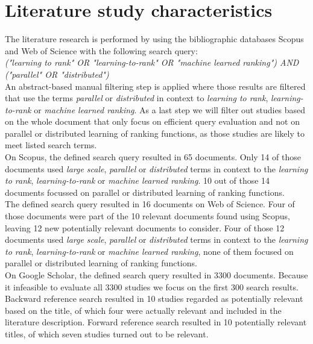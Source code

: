 \section{Literature study characteristics}
The literature research is performed by using the bibliographic databases Scopus and Web of Science with the following search query:\\

\emph{("learning to rank" \emph{OR} "learning-to-rank" \emph{OR} "machine learned ranking") \emph{AND} ("parallel" \emph{OR} "distributed")}\\
 
An abstract-based manual filtering step is applied where those results are filtered that use the terms \emph{parallel} or \emph{distributed} in context to \emph{learning to rank}, \emph{learning-to-rank} or \emph{machine learned ranking}. As a last step we will filter out studies based on the whole document that only focus on efficient query evaluation and not on parallel or distributed learning of ranking functions, as those studies are likely to meet listed search terms.\\

On Scopus, the defined search query resulted in 65 documents. Only 14 of those documents used \emph{large scale}, \emph{parallel} or \emph{distributed} terms in context to the \emph{learning to rank}, \emph{learning-to-rank} or \emph{machine learned ranking}. 10 out of those 14 documents focussed on parallel or distributed learning of ranking functions.\\

The defined search query resulted in 16 documents on Web of Science. Four of those documents were part of the 10 relevant documents found using Scopus, leaving 12 new potentially relevant documents to consider. Four of those 12 documents used \emph{large scale}, \emph{parallel} or \emph{distributed} terms in context to the \emph{learning to rank}, \emph{learning-to-rank} or \emph{machine learned ranking}, none of them focused on parallel or distributed learning of ranking functions.\\

On Google Scholar, the defined search query resulted in 3300 documents. Because it infeasible to evaluate all 3300 studies we focus on the first 300 search results.\\

Backward reference search resulted in 10 studies regarded as potentially relevant based on the title, of which four were actually relevant and included in the literature description. Forward reference search resulted in 10 potentially relevant titles, of which seven studies turned out to be relevant.\\

